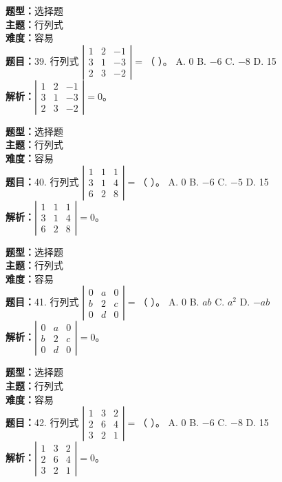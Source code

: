 \documentclass{ctexart}
\newenvironment{question}[5]{%
	\noindent\textbf{题型：}#1\\
	\textbf{主题：}#2\\
	\textbf{难度：}#3\\
	\textbf{题目：}#4\\
	\textbf{解析：}#5\\
	\vspace{1em}
}{}
\begin{document}
\begin{question}
	{选择题}
	{行列式}
	{容易}
	{39. 行列式 $\left|\begin{array}{lll}1 & 2 & -1 \\ 3 & 1 & -3 \\ 2 & 3 & -2\end{array}\right|=$（ ）。
		A. 0 \quad B. $-6$ \quad C. $-8$ \quad D. 15}
	{$\left|\begin{array}{lll}1 & 2 & -1 \\ 3 & 1 & -3 \\ 2 & 3 & -2\end{array}\right|=0$。}
\end{question}

\begin{question}
	{选择题}
	{行列式}
	{容易}
	{40. 行列式 $\left|\begin{array}{lll}1 & 1 & 1 \\ 3 & 1 & 4 \\ 6 & 2 & 8\end{array}\right|=$（ ）。
		A. 0 \quad B. $-6$ \quad C. $-5$ \quad D. 15}
	{$\left|\begin{array}{lll}1 & 1 & 1 \\ 3 & 1 & 4 \\ 6 & 2 & 8\end{array}\right|=0$。}
\end{question}

\begin{question}
	{选择题}
	{行列式}
	{容易}
	{41. 行列式 $\left|\begin{array}{lll}0 & a & 0 \\ b & 2 & c \\ 0 & d & 0\end{array}\right|=$（ ）。
		A. 0 \quad B. $ab$ \quad C. $a^2$ \quad D. $-ab$}
	{$\left|\begin{array}{lll}0 & a & 0 \\ b & 2 & c \\ 0 & d & 0\end{array}\right|=0$。}
\end{question}

\begin{question}
	{选择题}
	{行列式}
	{容易}
	{42. 行列式 $\left|\begin{array}{lll}1 & 3 & 2 \\ 2 & 6 & 4 \\ 3 & 2 & 1\end{array}\right|=$（ ）。
		A. 0 \quad B. $-6$ \quad C. $-8$ \quad D. 15}
	{$\left|\begin{array}{lll}1 & 3 & 2 \\ 2 & 6 & 4 \\ 3 & 2 & 1\end{array}\right|=0$。}
\end{question}
\end{document}
